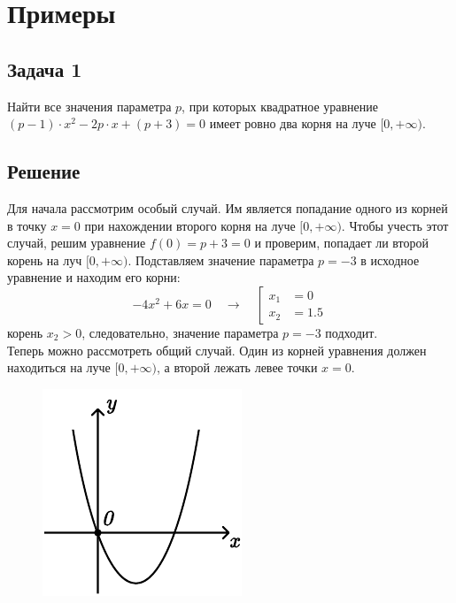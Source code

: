 \section {Примеры}

\subsection * {Задача 1}
Найти все значения параметра $p$, при которых квадратное уравнение
$(p - 1) \cdot x^2 - 2p \cdot x + (p + 3) = 0$ имеет ровно два корня на луче $[0, +\infty)$.

\subsection * {Решение}
Для начала рассмотрим особый случай. Им является попадание одного из корней в точку $x = 0$ при
нахождении второго корня на луче $[0, +\infty)$. Чтобы учесть этот случай, решим уравнение
$f(0) = p + 3 = 0$ и проверим, попадает ли второй корень на луч $[0, +\infty)$. Подставляем
значение параметра $p = -3$ в исходное уравнение и находим его корни:
\begin {equation*}
    -4x^2 + 6x = 0
    \quad\longrightarrow\quad
    \left[
        \begin {aligned}
            x_1 &= 0
            \\
            x_2 &= 1.5
        \end {aligned}
    \right.
\end {equation*}
корень $x_2 > 0$, следовательно, значение параметра $p = -3$ подходит.\\

Теперь можно рассмотреть общий случай. Один из корней уравнения должен находиться на луче
$[0, +\infty)$, а второй лежать левее точки $x = 0$.

\begin {figure} [h]
    \begin {minipage} [t] {\linewidth}
        \centering
        \includegraphics [width=0.3\linewidth] {image/image_16.pdf}
    \end {minipage}
\end {figure}

